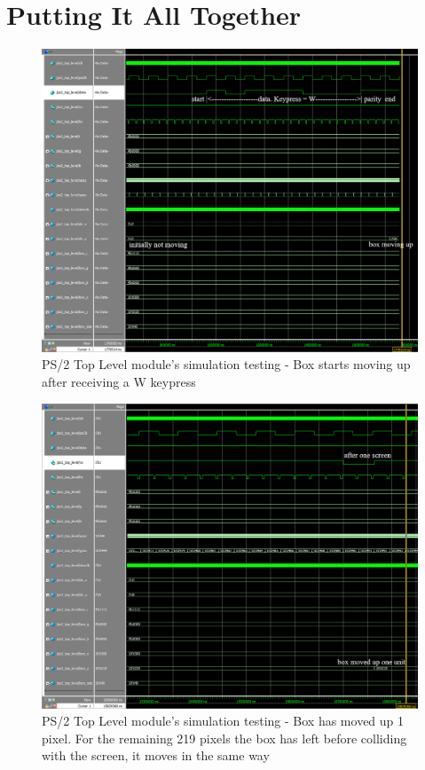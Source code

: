 \documentclass[12pt]{article}
\numberwithin{figure}{subsection}
\begin{document}
\section{Putting It All Together}

\begin{figure}[ht]
  \centering
  \includegraphics[width=\textwidth]{ps2_top_level_simulation_dataw_box_starts_moving_up.png}
  \caption{PS/2 Top Level module’s simulation testing - Box starts moving up after receiving a W keypress}
  \label{fig:ps2_top_level_simulation_dataw_box_starts_moving_up}
\end{figure}

\newpage

\begin{figure}[ht]
  \centering
  \includegraphics[width=\textwidth]{ps2_top_level_simulation_box_move_up_one_unit.png}
  \caption{PS/2 Top Level module’s simulation testing - Box has moved up 1 pixel. For the remaining 219 pixels the box has left before colliding with the screen, it moves in the same way}
  \label{fig:ps2_top_level_simulation_box_move_up_one_unit}
\end{figure}
\end{document}
